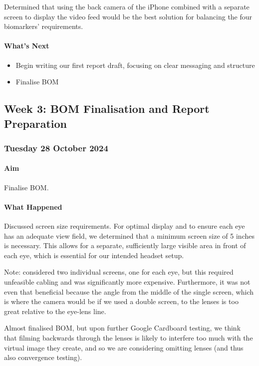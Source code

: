 Determined that using the back camera of the iPhone combined with a separate screen to display the video feed would be the best solution for balancing the four biomarkers' requirements.

\paragraph{What's Next}
\begin{itemize}
    \item Begin writing our first report draft, focusing on clear messaging and structure
    \item Finalise BOM
\end{itemize}

\subsection{Week 3: BOM Finalisation and Report Preparation}

\subsubsection*{Tuesday 28 October 2024}

\paragraph{Aim}
Finalise BOM.

\paragraph{What Happened}
Discussed screen size requirements. For optimal display and to ensure each eye has an adequate view field, we determined that a minimum screen size of 5 inches is necessary. This allows for a separate, sufficiently large visible area in front of each eye, which is essential for our intended headset setup.

Note: considered two individual screens, one for each eye, but this required unfeasible cabling and was significantly more expensive. Furthermore, it was not even that beneficial because the angle from the middle of the single screen, which is where the camera would be if we used a double screen, to the lenses is too great relative to the eye-lens line.

Almost finalised BOM, but upon further Google Cardboard testing, we think that filming backwards through the lenses is likely to interfere too much with the virtual image they create, and so we are considering omitting lenses (and thus also convergence testing).

